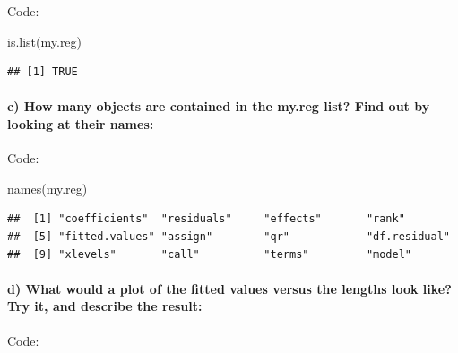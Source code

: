 \documentclass[
]{article}
\newenvironment{Shaded}{\begin{snugshade}}{\end{snugshade}}
\newcommand{\AttributeTok}[1]{\textcolor[rgb]{0.77,0.63,0.00}{#1}}
\newcommand{\CommentTok}[1]{\textcolor[rgb]{0.56,0.35,0.01}{\textit{#1}}}
\newcommand{\FunctionTok}[1]{\textcolor[rgb]{0.00,0.00,0.00}{#1}}
\newcommand{\NormalTok}[1]{#1}
\newcommand{\OtherTok}[1]{\textcolor[rgb]{0.56,0.35,0.01}{#1}}
\newcommand{\SpecialCharTok}[1]{\textcolor[rgb]{0.00,0.00,0.00}{#1}}
\newcommand{\StringTok}[1]{\textcolor[rgb]{0.31,0.60,0.02}{#1}}
\begin{document}
\hfill\break
Code:

\begin{Shaded}
\begin{Highlighting}[]
\FunctionTok{is.list}\NormalTok{(my.reg)}
\end{Highlighting}
\end{Shaded}

\begin{verbatim}
## [1] TRUE
\end{verbatim}

\hypertarget{c-how-many-objects-are-contained-in-the-my.reg-list-find-out-by-looking-at-their-names}{%
\paragraph{c) How many objects are contained in the my.reg list? Find
out by looking at their
names:}\label{c-how-many-objects-are-contained-in-the-my.reg-list-find-out-by-looking-at-their-names}}

\hfill\break
Code:

\begin{Shaded}
\begin{Highlighting}[]
\FunctionTok{names}\NormalTok{(my.reg)}
\end{Highlighting}
\end{Shaded}

\begin{verbatim}
##  [1] "coefficients"  "residuals"     "effects"       "rank"         
##  [5] "fitted.values" "assign"        "qr"            "df.residual"  
##  [9] "xlevels"       "call"          "terms"         "model"
\end{verbatim}

\hypertarget{d-what-would-a-plot-of-the-fitted-values-versus-the-lengths-look-like-try-it-and-describe-the-result}{%
\paragraph{d) What would a plot of the fitted values versus the lengths
look like? Try it, and describe the
result:}\label{d-what-would-a-plot-of-the-fitted-values-versus-the-lengths-look-like-try-it-and-describe-the-result}}

\hfill\break
Code:

\begin{Shaded}
\end{Shaded}
\end{document}
